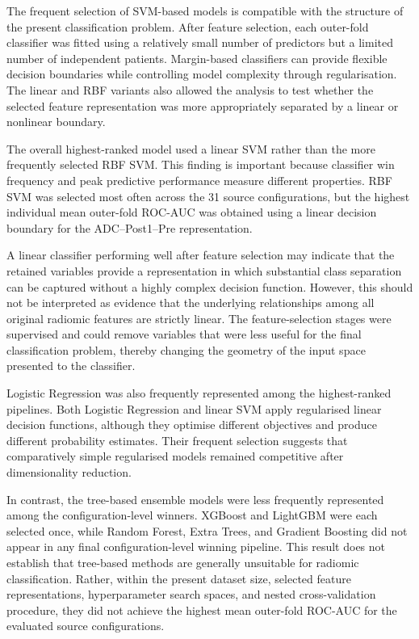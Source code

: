 \documentclass[12pt,twocolumn]{article}
\begin{document}
The frequent selection of SVM-based models is compatible with the
structure of the present classification problem. After feature
selection, each outer-fold classifier was fitted using a relatively
small number of predictors but a limited number of independent
patients. Margin-based classifiers can provide flexible decision
boundaries while controlling model complexity through regularisation.
The linear and RBF variants also allowed the analysis to test whether
the selected feature representation was more appropriately separated
by a linear or nonlinear boundary.

The overall highest-ranked model used a linear SVM rather than the
more frequently selected RBF SVM. This finding is important because
classifier win frequency and peak predictive performance measure
different properties. RBF SVM was selected most often across the 31
source configurations, but the highest individual mean outer-fold
ROC-AUC was obtained using a linear decision boundary for the
ADC--Post1--Pre representation.

A linear classifier performing well after feature selection may
indicate that the retained variables provide a representation in which
substantial class separation can be captured without a highly complex
decision function. However, this should not be interpreted as evidence
that the underlying relationships among all original radiomic features
are strictly linear. The feature-selection stages were supervised and
could remove variables that were less useful for the final
classification problem, thereby changing the geometry of the input
space presented to the classifier.

Logistic Regression was also frequently represented among the
highest-ranked pipelines. Both Logistic Regression and linear SVM
apply regularised linear decision functions, although they optimise
different objectives and produce different probability estimates.
Their frequent selection suggests that comparatively simple
regularised models remained competitive after dimensionality
reduction.

In contrast, the tree-based ensemble models were less frequently
represented among the configuration-level winners. XGBoost and
LightGBM were each selected once, while Random Forest, Extra Trees,
and Gradient Boosting did not appear in any final
configuration-level winning pipeline. This result does not establish
that tree-based methods are generally unsuitable for radiomic
classification. Rather, within the present dataset size, selected
feature representations, hyperparameter search spaces, and nested
cross-validation procedure, they did not achieve the highest mean
outer-fold ROC-AUC for the evaluated source configurations.
\end{document}
